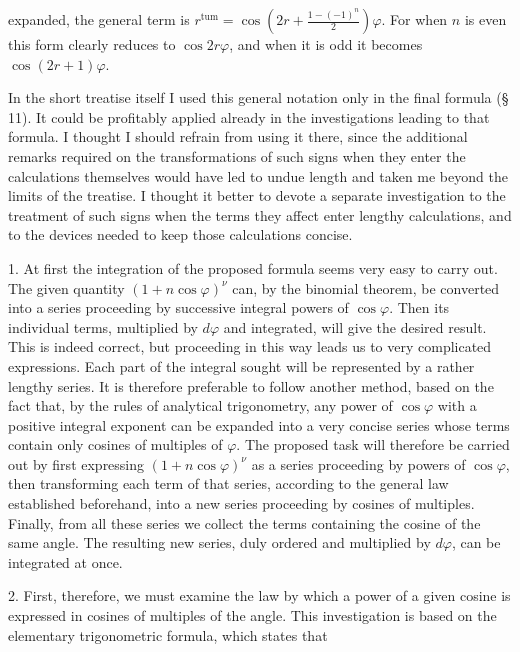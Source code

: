 expanded, the general term is $r^{\text{tum}} = \cos\left(2r+\frac{1-(-1)^n}{2}\right)\varphi$. For when $n$ is even this form clearly reduces to $\cos 2r\varphi$, and when it is odd it becomes $\cos(2r+1)\varphi$.

In the short treatise itself I used this general notation only in the final formula (\S\,11). It could be profitably applied already in the investigations leading to that formula. I thought I should refrain from using it there, since the additional remarks required on the transformations of such signs when they enter the calculations themselves would have led to undue length and taken me beyond the limits of the treatise. I thought it better to devote a separate investigation to the treatment of such signs when the terms they affect enter lengthy calculations, and to the devices needed to keep those calculations concise.

1. At first the integration of the proposed formula seems very easy to carry out. The given quantity $(1+n\cos\varphi)^\nu$ can, by the binomial theorem, be converted into a series proceeding by successive integral powers of $\cos\varphi$. Then its individual terms, multiplied by $d\varphi$ and integrated, will give the desired result. This is indeed correct, but proceeding in this way leads us to very complicated expressions. Each part of the integral sought will be represented by a rather lengthy series. It is therefore preferable to follow another method, based on the fact that, by the rules of analytical trigonometry, any power of $\cos\varphi$ with a positive integral exponent can be expanded into a very concise series whose terms contain only cosines of multiples of $\varphi$. The proposed task will therefore be carried out by first expressing $(1+n\cos\varphi)^\nu$ as a series proceeding by powers of $\cos\varphi$, then transforming each term of that series, according to the general law established beforehand, into a new series proceeding by cosines of multiples. Finally, from all these series we collect the terms containing the cosine of the same angle. The resulting new series, duly ordered and multiplied by $d\varphi$, can be integrated at once.

2. First, therefore, we must examine the law by which a power of a given cosine is expressed in cosines of multiples of the angle. This investigation is based on the elementary trigonometric formula, which states that
